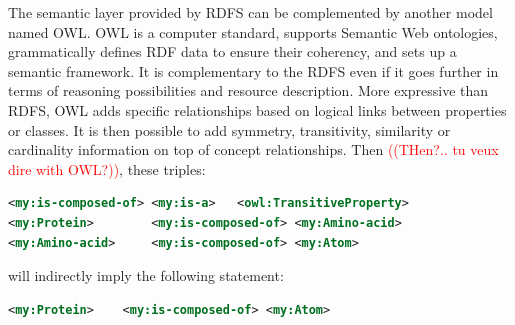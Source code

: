 \documentclass{vgtc}                          %
\newcommand*\mvb[1]{\textcolor{red}{#1}}
\begin{document}



The semantic layer provided by RDFS can be complemented by another model named OWL. OWL is a computer standard, supports Semantic Web ontologies, grammatically defines RDF data to ensure their coherency, and sets up a semantic framework. It is complementary to the RDFS even if it goes further in terms of reasoning possibilities and resource description. More expressive than RDFS, OWL adds specific relationships based on logical links between properties or classes. It is then possible to add symmetry, transitivity, similarity or cardinality information on top of concept relationships.
Then \mvb{((THen?.. tu veux dire with OWL?))}, these triples:
\begin{lstlisting}[language=XML]
<my:is-composed-of>	<my:is-a>	<owl:TransitiveProperty>
<my:Protein>		<my:is-composed-of>	<my:Amino-acid>
<my:Amino-acid>		<my:is-composed-of>	<my:Atom>
\end{lstlisting}
will indirectly imply the following statement:
\begin{lstlisting}[language=XML]
<my:Protein>	<my:is-composed-of>	<my:Atom>
\end{lstlisting}
\end{document}
